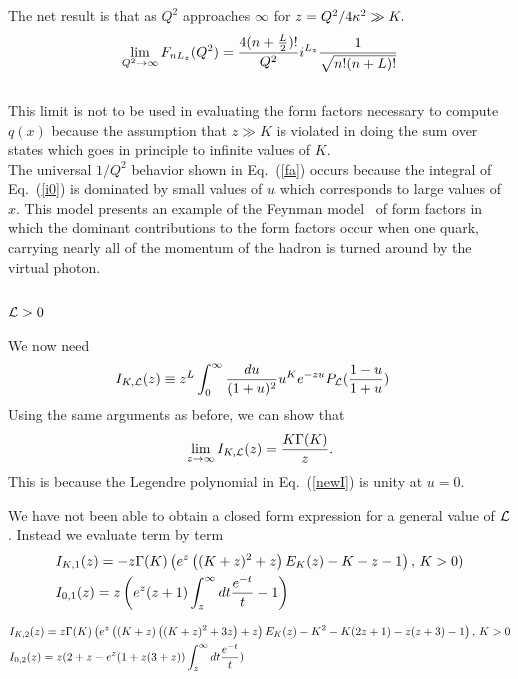 \documentclass[aps,prd,amsmath,longbibliography]{revtex4-1}
\newcommand{\eq}[1]{Eq.~(\ref{#1})}
\def\bea{\begin{eqnarray}}
\def\eea{\end{eqnarray}}\def\a{\alpha}\newcommand{\bfk}{{\bf k}}\newcommand{\bfq}{{\bf q}}
\def\calL{{\cal L}}\def\cL{{\cal L}}\def\GX{\Gamma_X}\def\o{\omega}\def\bfb{{\bf b}}
\begin{document}
{The net result is that as $Q^2$ approaches $\infty$ for $z=Q^2/4\kappa^2\gg K.$
\bea \lim_{Q^2\to\infty}F_{nL_z}(Q^2) = {4(n+{L\over2})!\over Q^2}i^{L_z}{1\over \sqrt{n!(n+L)!}}
\label{fa}\eea\\


\noindent This limit is not to be used in evaluating the form factors necessary to compute $q(x)$  because the assumption that $z\gg K$  is violated in doing the sum over states which goes in principle to infinite values of $K$.   
\\

The universal $1/Q^2$ behavior shown in \eq{fa} occurs because the integral of \eq{i0} is dominated by small values of $u$ which corresponds to large values of $x$. This model presents an example of the Feynman model~\cite{Feynman:1973xc} of form factors in which the dominant contributions to the form factors occur when one quark, carrying nearly all of the momentum of the hadron is turned around by the virtual photon.

 \subsection{$\calL>0$}
 
 We now need 
 \bea &I_{K,\calL}(z)\equiv z^L \int_0^\infty {du\over (1+u)^2}u^K e^{-z u} P_\calL({1-u\over 1+u})\label{newI} \eea
Using the same arguments as before, we can show that
\bea \lim_{z\to\infty}I_{K,\calL}(z)={K\G(K)\over z}.\eea
This is because the Legendre polynomial in \eq{newI} is unity at $u=0$.

We have not been able to obtain a closed form expression for a general value of $\calL$. Instead we evaluate term by term
\bea &I_{K,1}(z)=-z \Gamma (K) \left(e^z \left((K+z)^2+z\right) E_K(z)-K-z-1\right),\,K>0)\\&
I_{0,1}(z)=z \left(e^z (z+1) \int_z^\infty dt {e^{-t}\over t}-1\right)
\eea

\bea &I_{K,2}(z)=  z \Gamma (K) \left(e^z \left((K+z) \left((K+z)^2+3
   z\right)+z\right) E_K(z)-K^2-K(2 z+1)-z (z+3)-1\right),\,K>0\\&
   I_{0,2}(z)=z (2 + z -e^z (1 + z (3 + z))  \int_z^\infty dt {e^{-t}\over t})
   \eea
    
}
\end{document}
